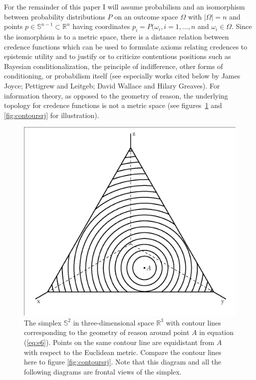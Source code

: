 \documentclass[phd,12pt,oneside]{ubcthesis}
\begin{document}
For the remainder of this paper I will assume probabilism and an
isomorphism between probability distributions $P$ on an outcome space
$\Omega$ with $|\Omega|=n$ and points
$p\in\mathbb{S}^{n-1}\subset\mathbb{R}^{n}$ having coordinates
$p_{i}=P(\omega_{i},i=1,\ldots,n$ and $\omega_{i}\in{}\Omega$. Since
the isomorphism is to a metric space, there is a distance relation
between credence functions which can be used to formulate axioms
relating credences to epistemic utility and to justify or to criticize
contentious positions such as Bayesian conditionalization, the
principle of indifference, other forms of conditioning, or probabilism
itself (see especially works cited below by James Joyce; Pettigrew and
Leitgeb; David Wallace and Hilary Greaves). For information theory, as
opposed to the geometry of reason, the underlying topology for
credence functions is not a metric space (see
figures~\ref{fig:contourslp} and \ref{fig:contoursrj} for
illustration).

\begin{figure}[ht!]
    \begin{minipage}[h]{.7\linewidth}
      \includegraphics[width=\textwidth]{contourslp.eps}
      \caption{\footnotesize The simplex $\mathbb{S}^{2}$ in
        three-dimensional space $\mathbb{R}^{3}$ with contour lines
        corresponding to the geometry of reason around point $A$ in
        equation (\ref{eq:e6}). Points on the same contour line are
        equidistant from $A$ with respect to the Euclidean metric.
        Compare the contour lines here to figure
        \ref{fig:contoursrj}. Note that this diagram and all the
        following diagrams are frontal views of the simplex.}
      \label{fig:contourslp}
    \end{minipage}
\end{figure}
\end{document}
